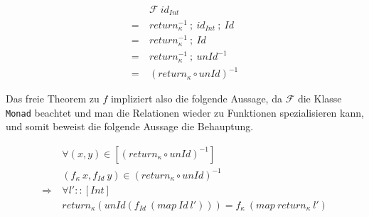 \begin{align*}
& \mathcal{F}\ id_{Int} \\
=~& return_{\kappa}^{-1}~;~id_{Int}~;~Id \\
=~& return_{\kappa}^{-1}~;~Id \\
=~& return_{\kappa}^{-1}~;~unId^{-1} \\
=~& (return_{\kappa} \circ unId)^{-1}
\end{align*}

Das freie Theorem zu $f$ impliziert also die folgende Aussage, da $\mathcal{F}$ die Klasse \texttt{Monad} beachtet und man
die Relationen wieder zu Funktionen spezialisieren kann, und somit beweist die folgende Aussage die Behauptung.

\begin{align*}
& \forall (x, y) \in [(return_{\kappa} \circ unId)^{-1}] \\
& (f_{\kappa}\ x, f_{Id}\ y) \in (return_{\kappa} \circ unId)^{-1} \\
\Rightarrow~& \forall l' :: [Int] \\
& return_{\kappa} (unId (f_{Id}\ (map\ Id\ l'))) = f_{\kappa}\ (map\ return_{\kappa}\ l')
\end{align*}


%
%
%
%
%
